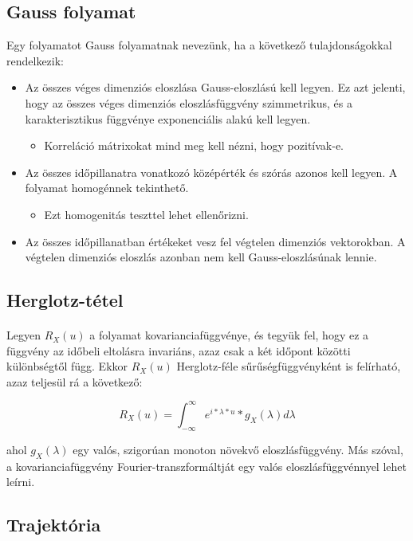 \documentclass[11pt,a4pape,draftr]{article}
\begin{document}
			\subsection{Gauss folyamat}
			Egy folyamatot Gauss folyamatnak nevezünk, ha a következő tulajdonságokkal rendelkezik:
			\begin{itemize}
				\item Az összes véges dimenziós eloszlása Gauss-eloszlású kell legyen. Ez azt jelenti, hogy az összes véges dimenziós eloszlásfüggvény szimmetrikus, és a karakterisztikus függvénye exponenciális alakú kell legyen.
				\begin{itemize}
					\item Korreláció mátrixokat mind meg kell nézni, hogy pozitívak-e.
				\end{itemize}
					\item Az összes időpillanatra vonatkozó középérték és szórás azonos kell legyen. A folyamat homogénnek tekinthető.
				\begin{itemize}
					\item Ezt homogenitás teszttel lehet ellenőrizni.
				\end{itemize}
				\item Az összes időpillanatban értékeket vesz fel végtelen dimenziós vektorokban. A végtelen dimenziós eloszlás azonban nem kell Gauss-eloszlásúnak lennie.
			\end{itemize}
			\subsection{Herglotz-tétel}
				\paragraph{}
					Legyen $R_X (u)$ a folyamat kovarianciafüggvénye, és tegyük fel, hogy ez a függvény az időbeli eltolásra invariáns, azaz csak a két időpont közötti különbségtől függ. Ekkor $R_X (u)$ Herglotz-féle sűrűségfüggvényként is felírható, azaz teljesül rá a következő:

					$$R_X (u)=\int_{-\infty}^\infty e^{i*\lambda*u}*g_X(\lambda)d\lambda$$

					ahol $g_X(\lambda)$ egy valós, szigorúan monoton növekvő eloszlásfüggvény. Más szóval, a kovarianciafüggvény Fourier-transzformáltját egy valós eloszlásfüggvénnyel lehet leírni.
			\subsection{Trajektória}
\end{document}
